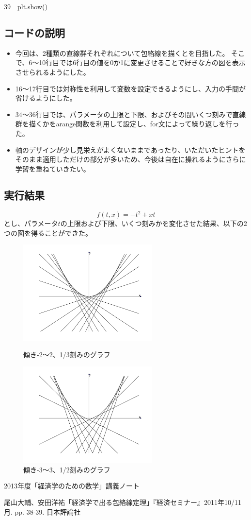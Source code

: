\documentclass{jsarticle}
\begin{document}
39~~plt.show()

\subsection{コードの説明}
\begin{itemize}
\item 今回は、2種類の直線群それぞれについて包絡線を描くとを目指した。
そこで、6～10行目では6行目の値を0か1に変更させることで好きな方の図を表示させられるようにした。
\item 16～17行目では対称性を利用して変数を設定できるようにし、入力の手間が省けるようにした。
\item 34～36行目では、パラメータの上限と下限、およびその間いくつ刻みで直線群を描くかをarange関数を利用して設定し、for文によって繰り返しを行った。
\item 軸のデザインが少し見栄えがよくないままであったり、いただいたヒントをそのまま適用しただけの部分が多いため、今後は自在に操れるようにさらに学習を重ねていきたい。
\end{itemize}

\subsection{実行結果}
\[ f(t,x)=-t^2+xt \]とし、パラメータ$t$の上限および下限、いくつ刻みかを変化させた結果、以下の2つの図を得ることができた。
\begin{figure}[h]
	\centering
	\begin{minipage}{0.4\columnwidth}
		\centering
		\includegraphics[width=7cm]{envelope0.pdf}
		\caption{傾き-2～2、1/3刻みのグラフ}
		\label{fig0}
	\end{minipage}
	\begin{minipage}{0.4\columnwidth}
		\centering
		\includegraphics[width=7cm]{envelope1.pdf}
		\caption{傾き-3～3、1/2刻みのグラフ}
		\label{fig1}
	\end{minipage}
\end{figure}%

\begin{thebibliography}{9}
\item 2013年度「経済学のための数学」講義ノート
\item 尾山大輔、安田洋祐「経済学で出る包絡線定理」『経済セミナー』2011年10/11月. pp. 38-39. 日本評論社
\end{thebibliography}
\end{document}
